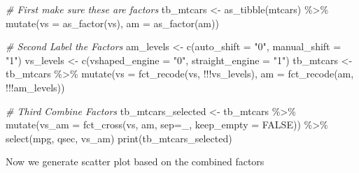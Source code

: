 \documentclass[
]{book}
\newenvironment{Shaded}{\begin{snugshade}}{\end{snugshade}}
\newcommand{\AttributeTok}[1]{\textcolor[rgb]{0.77,0.63,0.00}{#1}}
\newcommand{\CommentTok}[1]{\textcolor[rgb]{0.56,0.35,0.01}{\textit{#1}}}
\newcommand{\ConstantTok}[1]{\textcolor[rgb]{0.00,0.00,0.00}{#1}}
\newcommand{\FunctionTok}[1]{\textcolor[rgb]{0.00,0.00,0.00}{#1}}
\newcommand{\NormalTok}[1]{#1}
\newcommand{\OtherTok}[1]{\textcolor[rgb]{0.56,0.35,0.01}{#1}}
\newcommand{\SpecialCharTok}[1]{\textcolor[rgb]{0.00,0.00,0.00}{#1}}
\newcommand{\StringTok}[1]{\textcolor[rgb]{0.31,0.60,0.02}{#1}}
\begin{document}
\begin{Shaded}
\begin{Highlighting}[]
\CommentTok{\# First make sure these are factors}
\NormalTok{tb\_mtcars }\OtherTok{\textless{}{-}} \FunctionTok{as\_tibble}\NormalTok{(mtcars) }\SpecialCharTok{\%\textgreater{}\%} 
  \FunctionTok{mutate}\NormalTok{(}\AttributeTok{vs =} \FunctionTok{as\_factor}\NormalTok{(vs), }\AttributeTok{am =} \FunctionTok{as\_factor}\NormalTok{(am))}

\CommentTok{\# Second Label the Factors}
\NormalTok{am\_levels }\OtherTok{\textless{}{-}} \FunctionTok{c}\NormalTok{(}\AttributeTok{auto\_shift =} \StringTok{"0"}\NormalTok{, }\AttributeTok{manual\_shift =} \StringTok{"1"}\NormalTok{)}
\NormalTok{vs\_levels }\OtherTok{\textless{}{-}} \FunctionTok{c}\NormalTok{(}\AttributeTok{vshaped\_engine =} \StringTok{"0"}\NormalTok{, }\AttributeTok{straight\_engine =} \StringTok{"1"}\NormalTok{)}
\NormalTok{tb\_mtcars }\OtherTok{\textless{}{-}}\NormalTok{ tb\_mtcars }\SpecialCharTok{\%\textgreater{}\%} 
  \FunctionTok{mutate}\NormalTok{(}\AttributeTok{vs =} \FunctionTok{fct\_recode}\NormalTok{(vs, }\SpecialCharTok{!!!}\NormalTok{vs\_levels),}
         \AttributeTok{am =} \FunctionTok{fct\_recode}\NormalTok{(am, }\SpecialCharTok{!!!}\NormalTok{am\_levels))}

\CommentTok{\# Third Combine Factors}
\NormalTok{tb\_mtcars\_selected }\OtherTok{\textless{}{-}}\NormalTok{ tb\_mtcars }\SpecialCharTok{\%\textgreater{}\%}
  \FunctionTok{mutate}\NormalTok{(}\AttributeTok{vs\_am =} \FunctionTok{fct\_cross}\NormalTok{(vs, am, }\AttributeTok{sep=}\StringTok{\textquotesingle{}\_\textquotesingle{}}\NormalTok{, }\AttributeTok{keep\_empty =} \ConstantTok{FALSE}\NormalTok{)) }\SpecialCharTok{\%\textgreater{}\%}
  \FunctionTok{select}\NormalTok{(mpg, qsec, vs\_am)}
\FunctionTok{print}\NormalTok{(tb\_mtcars\_selected)}
\end{Highlighting}
\end{Shaded}

Now we generate scatter plot based on the combined factors
\end{document}
